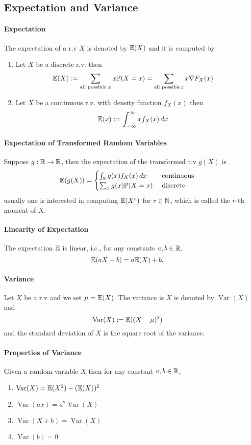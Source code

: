 \subsection{Expectation and Variance}
\paragraph{Expectation}
The expectation of a r.v \(X\) is denoted by \(\mathbb{E}(X)\) and it is computed by 
\begin{enumerate}
    \item Let \(X\) be a discrete r.v. then 
    \[\mathbb{E}(X) := \sum_{\text{all possible } x} x\mathbb{P}(X = x) = \sum_{\text{all possible} x} x\nabla F_X(x)\]
    \item Let \(X\) be a continuous r.v. with density function \(f_X(x)\) then
    \[\mathbb{E}(x) := \int_{-\infty}^\infty xf_X(x) \, dx\]
\end{enumerate}

\paragraph{Expectation of Transformed Random Variables}
Suppose \(g: \mathbb{R} \to \mathbb{R}\), then the expectation of the transformed r.v \(g(X)\) is 
\[\mathbb{E}(g(X)) = \begin{cases}
    \int_{\mathbb{R}} g(x)f_X(x) \, dx & \text{ continuous} \\
    \sum_x g(x)\mathbb{P}(X = x) & \text{ discrete}
\end{cases}
\]
usually one is interested in computing \(\mathbb{E}(X^r)\) for \(r \in \mathbb{N}\), which is called the \(r\)-th moment of \(X\).

\paragraph{Linearity of Expectation}
The expectation \(\mathbb{E}\) is linear, i.e., for any constants \(a,b \in \mathbb{R}\),
\[\mathbb{E}(aX + b) = a\mathbb{E}(X) + b.\]

\paragraph{Variance}
Let \(X\) be a r.v and we set \(\mu = \mathbb{E}(X)\). The variance is \(X\) is denoted by \(\operatorname{Var}(X)\) and 
\[\operatorname{Var}(X) := \mathbb{E}((X - \mu)^2)\]
and the standard deviation of \(X\) is the square root of the variance.

\paragraph{Properties of Variance}
Given a random variable \(X\) then for any constant \(a,b \in \mathbb{R}\),
\begin{enumerate}
    \item \(\operatorname{Var}(X) = \mathbb{E}(X^2) - (\mathbb{E}(X))^2\)
    \item \(\operatorname{Var}(ax) = a^2\operatorname{Var}(X)\)
    \item \(\operatorname{Var}(X + b) = \operatorname{Var}(X)\)
    \item \(\operatorname{Var}(b) = 0\)
\end{enumerate}

